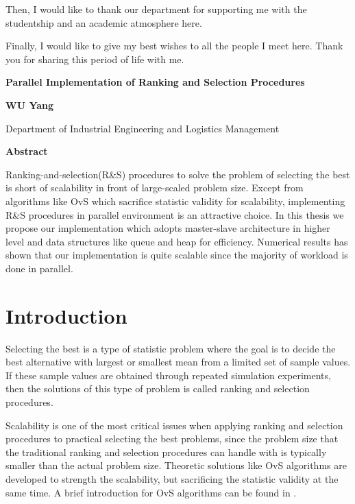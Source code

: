 \documentclass[12pt,a4paper]{report}
\begin{document}
Then, I would like to thank our department for supporting me with the studentship and an academic atmosphere here.

Finally, I would like to give my best wishes to all the people I meet here. Thank you for sharing this period of life with me.

\newpage
{}
\tableofcontents
\listoffigures
\listoftables

\newpage
{}
\begin{center}
{\Large\bf Parallel Implementation of Ranking and Selection Procedures}
\vspace{0.5cm}

{\large \bf WU Yang}\normalsize

\medskip

Department of Industrial Engineering and Logistics Management

\end{center}
\vspace{1.5cm}
\centerline{{\bf \large Abstract}}
\vspace{1.5cm}

Ranking-and-selection(R\&S) procedures to solve the problem of selecting the best is short of scalability in front of large-scaled problem size. Except from algorithms like OvS which sacrifice statistic validity for scalability, implementing R\&S procedures in parallel environment is an attractive choice. In this thesis we propose our implementation which adopts master-slave architecture in higher level and data structures like queue and heap for efficiency. Numerical results has shown that our implementation is quite scalable since the majority of workload is done in parallel.

\newpage
{}

\chapter{Introduction}

Selecting the best is a type of statistic problem where the goal is to decide the best alternative with largest or smallest mean from a limited set of sample values. If these sample values are obtained through repeated simulation experiments, then the solutions of this type of problem is called ranking and selection procedures.

Scalability is one of the most critical issues when applying ranking and selection procedures to practical selecting the best problems, since the problem size that the traditional ranking and selection procedures can handle with is typically smaller than the actual problem size. Theoretic solutions like OvS algorithms are developed to strength the scalability, but sacrificing the statistic validity at the same time. A brief introduction for OvS algorithms can be found in \cite{potwsc09ovs}.
\end{document}
